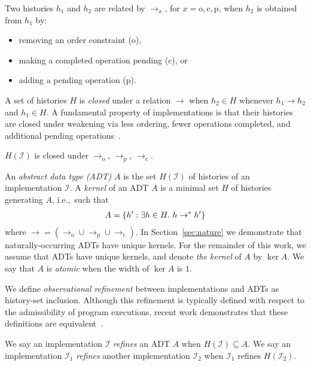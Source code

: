 Two histories $h_1$ and $h_2$ are related by $\to_x$, for $x = \mathrm{o},
\mathrm{c}, \mathrm{p}$, when $h_2$ is obtained from $h_1$ by:
\begin{itemize}

  \item removing an order constraint (o),

  \item making a completed operation pending (c), or

  \item adding a pending operation (p).

\end{itemize}
A set of histories $H$ is \emph{closed} under a relation $\to$ when $h_2 \in H$
whenever $h_1 \to h_2$ and $h_1 \in H$. A fundamental property of
implementations is that their histories are closed under weakening via less
ordering, fewer operations completed, and additional pending
operations~\cite{conf/popl/BouajjaniEEH15}.

\begin{lemma}

  $H(\mathcal{I})$ is closed under $\to_\mathrm{o}$, $\to_\mathrm{p}$, 
  $\to_\mathrm{c}$.

\end{lemma}

An \emph{abstract data type (ADT)} $A$ is the set $H(\mathcal{I})$ of histories
of an implementation $\mathcal{I}$. A \emph{kernel} of an ADT $A$ is a minimal
set $H$ of histories generating $A$, i.e.,~such that
\begin{align*}
  A = {\{{ h' : \exists h \in H.\ h \to^\ast h' }\}}
\end{align*}
where $\to = (\to_\mathrm{o} \cup \to_\mathrm{p} \cup \to_\mathrm{c})$. In
Section~\ref{sec:nature} we demonstrate that naturally-occurring ADTs have
unique kernels. For the remainder of this work, we assume that ADTs have unique
kernels, and denote \emph{the kernel} of $A$ by $\ker A$. We say that $A$ is
\emph{atomic} when the width of $\ker A$ is $1$.

We define \emph{observational refinement} between implementations and ADTs as
history-set inclusion. Although this refinement is typically defined with
respect to the admissibility of program executions, recent work demonstrates
that these definitions are equivalent~\cite{conf/popl/BouajjaniEEH15}.

\begin{definition}

  We say an implementation $\mathcal{I}$ \emph{refines} an ADT $A$ when
  $H(\mathcal{I}) \subseteq A$. We say an implementation $\mathcal{I}_1$
  \emph{refines} another implementation $\mathcal{I}_2$ when $\mathcal{I}_1$
  refines $H(\mathcal{I}_2)$.

\end{definition}

